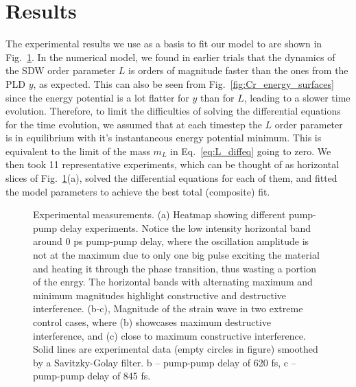 \section{Results}
The experimental results we use as a basis to fit our model to are shown in Fig.~\ref{fig:Cr_experimental}. In the numerical model, we found in earlier trials that the dynamics of the SDW order parameter $L$ is orders of magnitude faster than the ones from the PLD $y$, as expected. This can also be seen from Fig.~\ref{fig:Cr_energy_surfaces} since the energy potential is a lot flatter for $y$ than for $L$, leading to a slower time evolution. Therefore, to limit the difficulties of solving the differential equations for the time evolution, we assumed that at each timestep the $L$ order parameter is in equilibrium with it's instantaneous energy potential minimum. This is equivalent to the limit of the mass $m_L$ in Eq.~\ref{eq:L_diffeq} going to zero. We then took 11 representative experiments, which can be thought of as horizontal slices of Fig.~\ref{fig:Cr_experimental}(a), solved the differential equations for each of them, and fitted the model parameters to achieve the best total (composite) fit.       

\begin{figure}
\caption{\label{fig:Cr_experimental}Experimental measurements. (a) Heatmap showing different pump-pump delay experiments. Notice the low intensity horizontal band around 0 ps pump-pump delay, where the oscillation amplitude is not at the maximum due to only one big pulse exciting the material and heating it through the phase transition, thus wasting a portion of the enrgy. The horizontal bands with alternating maximum and minimum magnitudes highlight constructive and destructive interference. (b-c), Magnitude of the strain wave in two extreme control cases, where (b) showcases maximum destructive interference, and (c) close to maximum constructive interference. Solid lines are experimental data (empty circles in figure) smoothed by a Savitzky-Golay filter.  b – pump-pump delay of 620 fs, c – pump-pump delay of 845 fs.}
\end{figure}

